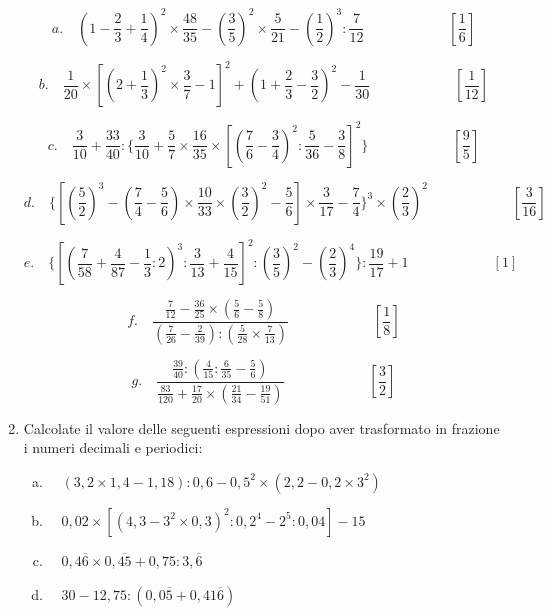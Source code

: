 \documentclass[]{article}
\newcommand*\result[1] {\hspace*{0em plus 1fill}{\footnotesize \makebox{[#1]}}}
\begin{document}
\begin{enumerate}
		\[a.\quad \left( 1-\frac23+\frac14 \right)^2\times\frac{48}{35}-\left(\frac35\right)^2\times\frac5{21}-\left(\frac12\right)^3:\frac7{12}\qquad\qquad\qquad\left[\frac16\right] \]
		
		\[b.\quad\frac1{20}\times\left[\left(2+\frac13\right)^2\times\frac37-1\right]^2+\left(1+\frac23-\frac32\right)^2-\frac1{30}\qquad\qquad\qquad\left[\frac1{12}\right]\]
		
		\[c.\quad\frac3{10}+\frac{33}{40}:\Bigg\{\frac3{10}+\frac57\times\frac{16}{35}\times\left[\left(\frac76-\frac34\right)^2:\frac5{36}-\frac38\right]^2\Bigg\}\qquad\qquad\qquad\left[\frac95\right]\]
		
		\[d.\quad\Bigg\{\left[\left(\frac52\right)^3-\left(\frac74-\frac56\right)\times\frac{10}{33}\times\left(\frac32\right)^2-\frac56\right]\times\frac3{17}-\frac74\Bigg\}^3\times\left(\frac23\right)^2\qquad\qquad\qquad\left[\frac3{16}\right]\]
		
		\[e.\quad\Bigg\{\left[\left(\frac7{58}+\frac4{87}-\frac13:2\right)^3:\frac3{13}+\frac4{15}\right]^2:\left(\frac35\right)^2-\left(\frac23\right)^4\Bigg\}:\frac{19}{17}+1\qquad\qquad\qquad\left[1\right]\]
		
		\[f.\quad\frac{\frac7{12}-\frac{36}{25}\times\left(\frac56-\frac58\right)}{\left(\frac7{26}-\frac2{39}\right):\left(\frac5{28}\times\frac7{13}\right)}\qquad\qquad\qquad\left[\frac18\right]\]
		
		\[g.\quad\frac{\frac{39}{40}:\left(\frac4{15}:\frac6{35}-\frac56\right)}{\frac{83}{120}+\frac{17}{20}\times\left(\frac{21}{34}-\frac{19}{51}\right)}\qquad\qquad\qquad\left[\frac32\right]\]
		
		
		\item Calcolate il valore delle seguenti espressioni dopo aver trasformato in frazione i numeri decimali e periodici:
		
		\begin{enumerate}[a.]
			\item \(\quad(3,2\times1,4-1,18):0,6-0,5^2\times(2,2-0,2\times3^2)\) \result{\(\frac{27}5\)}
			
			\item \(\quad0,02\times[(4,3-3^2\times0,3)^2:0,2^4-2^5:0,04]-15\) \result{1}
			
			\item \(\quad0,4\overline{6}\times0,\overline{45}+0,75:3,\overline6\) \result{\(	\frac5{12}\)}
			
			\item \(\quad30-12,75:(0,0\overline5+0,41\overline6) \) \result{3}
		\end{enumerate}
		

\end{enumerate}
\end{document}
